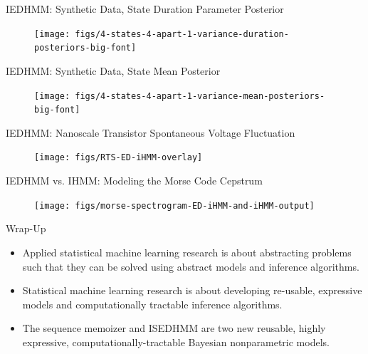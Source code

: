 \documentclass[xcolor=dvipsnames]{beamer}
\begin{document}
\begin{frame}[t]{IEDHMM: Synthetic Data, State Duration Parameter Posterior }
	\begin{figure}[t]
		\begin{center}
			\texttt{[image: figs/4-states-4-apart-1-variance-duration-posteriors-big-font]}
		\end{center}
	\end{figure}
\end{frame}

\begin{frame}[t]{IEDHMM: Synthetic Data, State Mean Posterior}
	\begin{figure}[t]
		\begin{center}
			\texttt{[image: figs/4-states-4-apart-1-variance-mean-posteriors-big-font]}
		\end{center}
	\end{figure}
\end{frame}

\begin{frame}[t]{IEDHMM: Nanoscale Transistor Spontaneous Voltage Fluctuation}
	\begin{figure}[t]
		\begin{center}
			\texttt{[image: figs/RTS-ED-iHMM-overlay]}
		\end{center}
	\end{figure}
\end{frame}



\begin{frame}[t]{IEDHMM vs. IHMM:  Modeling the Morse Code Cepstrum}
	\begin{figure}[t]
		\begin{center}
			\texttt{[image: figs/morse-spectrogram-ED-iHMM-and-iHMM-output]}
		\end{center}
	\end{figure}
\end{frame}



\begin{frame}[t]{Wrap-Up}
\begin{itemize}
\item Applied statistical machine learning research is about abstracting problems such that they can be solved using abstract models and inference algorithms.
\item Statistical machine learning research is about developing re-usable, expressive models and computationally tractable inference algorithms.
\item The sequence memoizer and ISEDHMM are two new reusable, highly expressive, computationally-tractable Bayesian nonparametric models.
\end{itemize}

\end{frame}
\end{document}
